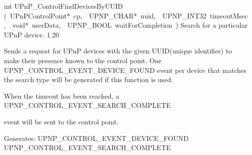 \documentclass{article}
\begin{document}
\begin{cxxentry}
\begin{cxxfunction}
\begin{cxxdoc}
\end{cxxdoc}
\end{cxxfunction}
\begin{cxxfunction}
{int}
        {UPnP\_ControlFindDevicesByUUID}
        {(\ UPnPControlPoint*\ cp,\ \ UPNP\_CHAR*\ uuid,\ \ UPNP\_INT32\ timeoutMsec,\ \ void*\ userData,\ \ UPNP\_BOOL\ waitForCompletion\ )}
        {Search for a particular UPnP device. }
        {1.20}
\begin{cxxdoc}

Sends a request for UPnP devices with the given UUID(unique identifier)
to make their presence known to the control point.  One
UPNP\_CONTROL\_EVENT\_DEVICE\_FOUND event per device that matches the
search type will be generated if this function is used.

When the timeout has been reached, a UPNP\_CONTROL\_EVENT\_SEARCH\_COMPLETE

event will be sent to the control point.

Generates:
UPNP\_CONTROL\_EVENT\_DEVICE\_FOUND
UPNP\_CONTROL\_EVENT\_SEARCH\_COMPLETE



\end{cxxdoc}
\end{cxxfunction}
\end{cxxentry}
\end{document}
